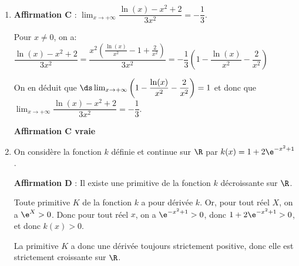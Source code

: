\begin{enumerate}
La fonction $f$ est dérivable donc continue sur $\R$. Elle est strictement croissante sur $\R$ et va de $-\infty$ à $+\infty$. Donc, d'après le corollaire du théorème des valeurs intermédiaires, l'équation $f(x)=-2$ admet une solution unique dans $\R$.

\begin{flushright}
\textbf{\blue Affirmation B fausse}
\end{flushright}

\item \textbf{Affirmation C} :
$\displaystyle\lim_{x \to + \infty} \dfrac{\ln(x) - x^2 +2}{3x^2} = - \dfrac13$.

Pour $x\neq 0$, on a:
$\dfrac{\ln(x) - x^2 +2}{3x^2}
= \dfrac{x^2 \left (\frac{\ln(x)}{x^2} -1 +\frac{2}{x^2} \right )}{3x^2}
= -\dfrac{1}{3} \left ( 1 -  \dfrac{\ln(x)}{x^2} -\dfrac{2}{x^2}  \right )$ 


On en déduit que
$\ds\lim_{x\to +\infty} \left ( 1 -  \dfrac{\ln(x)}{x^2} -\dfrac{2}{x^2}  \right )=1$ et donc que $\displaystyle\lim_{x \to + \infty} \dfrac{\ln(x) - x^2 +2}{3x^2} = - \dfrac13$.

\begin{flushright}
\textbf{\blue Affirmation C vraie}
\end{flushright}

\item On considère la fonction $k$ définie et continue sur $\R$ par
$k(x) = 1 + 2\e^{-x^2 + 1}$.

\textbf{Affirmation D} : Il existe une primitive de la fonction $k$ décroissante sur $\R$.

Toute primitive $K$ de la fonction $k$ a pour dérivée $k$. Or, pour tout réel $X$, on a $\e^{X}>0$. Donc pour tout réel $x$, on a $\e^{-x^2 + 1}>0$, donc $1+2\e^{-x^2 + 1}>0$, et donc $k(x)>0$.

La primitive $K$ a donc une dérivée toujours strictement positive, donc elle est strictement croissante sur $\R$.


\end{enumerate}
